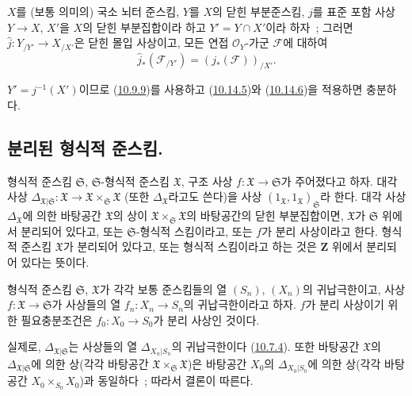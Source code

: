 \begin{corollary}[10.14.7]
\label{I.10.14.7-ko}
$X$를 (보통 의미의) 국소 뇌터 준스킴, $Y$를 $X$의 닫힌 부분준스킴,
$j$를 표준 포함 사상 $Y\to X$, $X'$을 $X$의 닫힌 부분집합이라 하고
$Y'=Y\cap X'$이라 하자~; 그러면
$\widehat{j}:Y_{/Y'}\to X_{/X'}$은 닫힌 몰입 사상이고, 모든 연접
$\mathscr{O}_Y$-가군 $\mathscr{F}$에 대하여
\[
  \widehat{j}_*(\mathscr{F}_{/Y'})=(j_*(\mathscr{F}))_{/X'}.
\]
\end{corollary}

$Y'=j^{-1}(X')$이므로 (\hyperref[I.10.9.9-ko]{10.9.9})를 사용하고
(\hyperref[I.10.14.5-ko]{10.14.5})와
(\hyperref[I.10.14.6-ko]{10.14.6})을 적용하면 충분하다.
\subsection{분리된 형식적 준스킴.}
\label{subsection:I.10.15-ko}

\begin{definition}[10.15.1]
\label{I.10.15.1-ko}
형식적 준스킴 $\mathfrak{S}$, $\mathfrak{S}$-형식적 준스킴
$\mathfrak{X}$, 구조 사상 $f:\mathfrak{X}\to\mathfrak{S}$가 주어졌다고
하자. 대각 사상
$\Delta_{\mathfrak{X}|\mathfrak{S}}:\mathfrak{X}\to
\mathfrak{X}\times_{\mathfrak{S}}\mathfrak{X}$ (또한
$\Delta_{\mathfrak{X}}$라고도 쓴다)을 사상
$(1_{\mathfrak{X}},1_{\mathfrak{X}})_{\mathfrak{S}}$라 한다. 대각 사상
$\Delta_{\mathfrak{X}}$에 의한 바탕공간 $\mathfrak{X}$의 상이
$\mathfrak{X}\times_{\mathfrak{S}}\mathfrak{X}$의 바탕공간의 닫힌 부분집합이면,
$\mathfrak{X}$가 $\mathfrak{S}$ 위에서 분리되어 있다고, 또는
$\mathfrak{S}$-형식적 스킴이라고, 또는 $f$가 분리 사상이라고 한다. 형식적
준스킴 $\mathfrak{X}$가 분리되어 있다고, 또는 형식적 스킴이라고 하는 것은
$\mathbf{Z}$ 위에서 분리되어 있다는 뜻이다.
\end{definition}

\begin{proposition}[10.15.2]
\label{I.10.15.2-ko}
형식적 준스킴 $\mathfrak{S}$, $\mathfrak{X}$가 각각 보통 준스킴들의 열
$(S_n)$, $(X_n)$의 귀납극한이고, 사상
$f:\mathfrak{X}\to\mathfrak{S}$가 사상들의 열
$f_n:X_n\to S_n$의 귀납극한이라고 하자. $f$가 분리 사상이기 위한
필요충분조건은 $f_0:X_0\to S_0$가 분리 사상인 것이다.
\end{proposition}

실제로, $\Delta_{\mathfrak{X}|\mathfrak{S}}$는 사상들의 열
$\Delta_{X_n|S_n}$의 귀납극한이다
(\hyperref[I.10.7.4-ko]{10.7.4}). 또한 바탕공간 $\mathfrak{X}$의
$\Delta_{\mathfrak{X}|\mathfrak{S}}$에 의한 상(각각 바탕공간
$\mathfrak{X}\times_{\mathfrak{S}}\mathfrak{X}$)은 바탕공간 $X_0$의
$\Delta_{X_0|S_0}$에 의한 상(각각 바탕공간
$X_0\times_{S_0}X_0$)과 동일하다~; 따라서 결론이 따른다.

